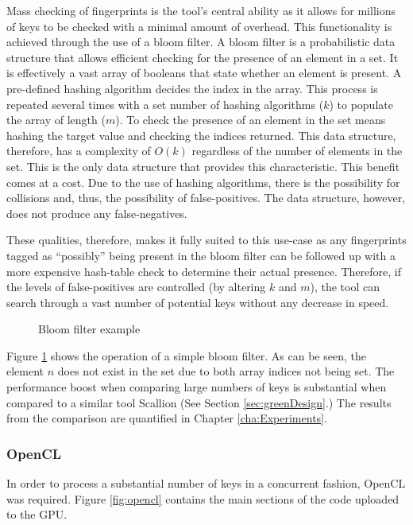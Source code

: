 Mass checking of fingerprints is the tool's central ability as it allows for millions of keys to be checked with a minimal amount of overhead. This functionality is achieved through the use of a bloom filter. A bloom filter is a probabilistic data structure that allows efficient checking for the presence of an element in a set. It is effectively a vast array of booleans that state whether an element is present. A pre-defined hashing algorithm decides the index in the array. This process is repeated several times with a set number of hashing algorithms ($k$) to populate the array of length ($m$). To check the presence of an element in the set means hashing the target value and checking the indices returned. This data structure, therefore, has a complexity of $O(k)$ regardless of the number of elements in the set. This is the only data structure that provides this characteristic. This benefit comes at a cost. Due to the use of hashing algorithms, there is the possibility for collisions and, thus, the possibility of false-positives. The data structure, however, does not produce any false-negatives. 

These qualities, therefore, makes it fully suited to this use-case as any fingerprints tagged as ``possibly'' being present in the bloom filter can be followed up with a more expensive hash-table check to determine their actual presence. Therefore, if the levels of false-positives are controlled (by altering $k$ and $m$), the tool can search through a vast number of potential keys without any decrease in speed.

\begin{figure}[h!]
    \centering
    
    \caption{Bloom filter example}
    \label{fig:bloom}
\end{figure}

Figure \ref{fig:bloom} shows the operation of a simple bloom filter. As can be seen, the element $n$ does not exist in the set due to both array indices not being set. The performance boost when comparing large numbers of keys is substantial when compared to a similar tool Scallion (See Section \ref{sec:greenDesign}.) The results from the comparison are quantified in Chapter \ref{cha:Experiments}.

\subsubsection*{OpenCL}

In order to process a substantial number of keys in a concurrent fashion, OpenCL was required. Figure \ref{fig:opencl} contains the main sections of the code uploaded to the GPU.

